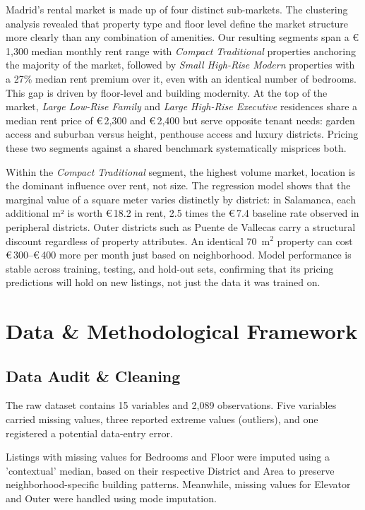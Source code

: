 \documentclass[10pt,a4paper,twocolumn]{article}
\newcommand{\eur}[1]{€\,#1}
\newcommand{\seg}[1]{\textit{#1}}          %
\begin{document}
Madrid’s rental market is made up of four distinct sub-markets. The clustering analysis revealed that property type and floor level define the market structure more clearly than any combination of amenities. Our resulting segments span a \eur{1,300} median monthly rent range with \seg{Compact Traditional} properties anchoring the majority of the market, followed by \seg{Small High-Rise Modern} properties with a 27\% median rent premium over it, even with an identical number of bedrooms. This gap is driven by floor-level and building modernity. At the top of the market, \seg{Large Low-Rise Family} and \seg{Large High-Rise Executive} residences share a median rent price of \eur{2,300} and \eur{2,400} but serve opposite tenant needs: garden access and suburban versus height, penthouse access and luxury districts. Pricing these two segments against a shared benchmark systematically misprices both.

Within the \seg{Compact Traditional} segment, the highest volume market, location is the dominant influence over rent, not size. The regression model shows that the marginal value of a square meter varies distinctly by district: in Salamanca, each additional m² is worth \eur{18.2} in rent, 2.5 times the \eur{7.4} baseline rate observed in peripheral districts. Outer districts such as Puente de Vallecas carry a structural discount regardless of property attributes. An identical 70~m$^{2}$ property can cost \eur{300}--\eur{400} more per month just based on neighborhood. Model performance is stable across training, testing, and hold-out sets, confirming that its pricing predictions will hold on new listings, not just the data it was trained on.


\section{Data \& Methodological Framework}

\subsection{Data Audit \& Cleaning}

The raw dataset contains 15 variables and 2,089 observations. Five variables carried missing values, three reported extreme values (outliers), and one registered a potential data-entry error.

Listings with missing values for Bedrooms and Floor were imputed using a 'contextual' median, based on their respective District and Area to preserve neighborhood-specific building patterns. Meanwhile, missing values for Elevator and Outer were handled using mode imputation.
\end{document}
